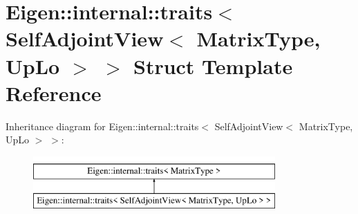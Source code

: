 \hypertarget{struct_eigen_1_1internal_1_1traits_3_01_self_adjoint_view_3_01_matrix_type_00_01_up_lo_01_4_01_4}{}\section{Eigen\+::internal\+::traits$<$ Self\+Adjoint\+View$<$ Matrix\+Type, Up\+Lo $>$ $>$ Struct Template Reference}
\label{struct_eigen_1_1internal_1_1traits_3_01_self_adjoint_view_3_01_matrix_type_00_01_up_lo_01_4_01_4}
Inheritance diagram for Eigen\+::internal\+::traits$<$ Self\+Adjoint\+View$<$ Matrix\+Type, Up\+Lo $>$ $>$\+:\begin{figure}[H]
\begin{center}
\leavevmode
\includegraphics[height=2.000000cm]{struct_eigen_1_1internal_1_1traits_3_01_self_adjoint_view_3_01_matrix_type_00_01_up_lo_01_4_01_4}
\end{center}
\end{figure}

